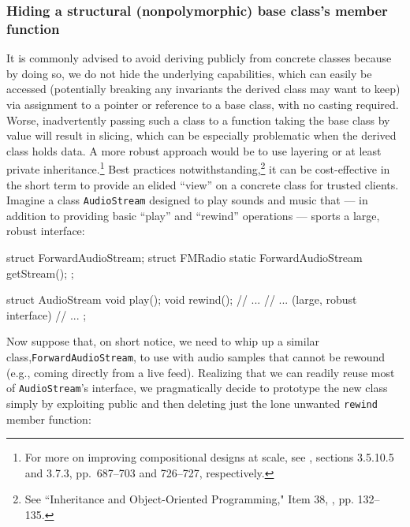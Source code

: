\subsubsection[Hiding a structural (nonpolymorphic) base class's member function]{Hiding a structural (nonpolymorphic) base class’s member function}\label{hiding-a-structural-(nonpolymorphic)-base-class's-member-function}

It is commonly advised to avoid deriving publicly from concrete classes because by doing so, we do not hide the underlying capabilities, which can easily be accessed (potentially breaking any invariants the derived class may want to keep) via assignment to a pointer or reference to a base class, with no casting required.  Worse, inadvertently passing such a class to a function taking the base class by value will result in slicing, which can be especially problematic when the derived class holds data. A more robust approach would be to use layering or at least private inheritance.\footnote{For more on improving compositional designs at scale, see
  \cite{lakos20}, sections 3.5.10.5 and 3.7.3, pp.~687--703 and
  726--727, respectively.} Best practices notwithstanding,\footnote{See ``Inheritance and Object-Oriented Programming," Item 38, \cite{meyers92}, pp. 132--135.} it can be cost-effective in the short
term to provide an elided ``view'' on a concrete class for trusted
clients. Imagine a class \lstinline!AudioStream! designed to play sounds
and music that --- in addition to providing basic ``play'' and
``rewind'' operations --- sports a large, robust interface:
\newpage%

\begin{emcppshiddenlisting}[emcppsbatch=e2]
struct ForwardAudioStream;
struct FMRadio {
    static ForwardAudioStream getStream();
};
\end{emcppshiddenlisting}
\begin{emcppslisting}[emcppsbatch=e2]
struct AudioStream
{
    void play();
    void rewind();
    // ...
    // ... (large, robust interface)
    // ...
};
\end{emcppslisting}


Now suppose that, on short notice, we need to whip up a similar
class,\linebreak[4] \lstinline!ForwardAudioStream!, to use with audio samples that
cannot be rewound (e.g., coming directly from a live feed). Realizing
that we can readily reuse most of \lstinline!AudioStream!'s interface, we
pragmatically decide to prototype the new class simply by exploiting
public  and then deleting just the lone
unwanted \lstinline!rewind! member function:

